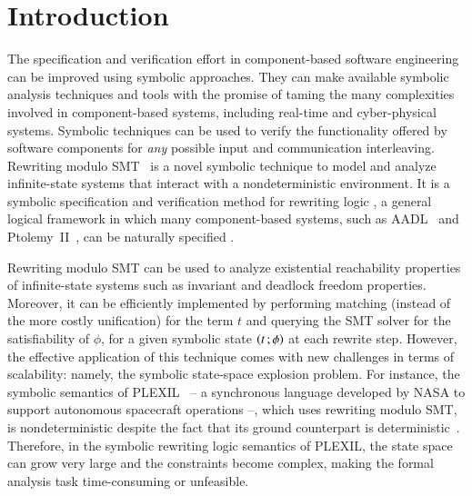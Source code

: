 
\section{Introduction}
\label{sec.intro}

The specification and verification effort in component-based software
engineering 
can be
improved using symbolic approaches.  They can make available symbolic analysis %
techniques and tools with the promise of taming the
many complexities involved in component-based systems, including real-time and cyber-physical
systems. %
Symbolic techniques can be used
to verify the functionality offered by software components for
\emph{any} possible input and communication interleaving. Rewriting
modulo SMT~\cite{rocha-rewsmtjlamp-2017} is a novel symbolic technique
to model and analyze %
infinite-state systems
that interact with a nondeterministic environment. 
It is a symbolic
specification and verification method for 
rewriting logic \cite{meseguer-rltcs-1992},
a general logical framework
in which many component-based systems,
such as AADL~\cite{mr-synch-aadl-fm14} and Ptolemy~II~\cite{ptolemy-journal}, %
can be naturally specified \cite{meseguer2012twenty}.


Rewriting modulo SMT can be used to analyze existential reachability
properties of infinite-state systems such as invariant and deadlock freedom
properties.  Moreover, it can be efficiently implemented by performing
matching (instead of the more costly unification) for the term $t$ and
querying the SMT solver for the satisfiability of $\phi$, for a given
symbolic state $\left( t \,; \phi \right)$ at each rewrite step. 
%
However, the
effective application of this technique comes with new challenges in
terms of scalability: namely, the symbolic state-space explosion
problem. %
For instance, the
symbolic semantics of
PLEXIL~\cite{rocha-thesis-2012,rocha-rewsmtjlamp-2017} -- a
synchronous language developed by NASA to support autonomous
spacecraft operations %
--, which uses rewriting modulo SMT, is nondeterministic despite the fact that its ground
counterpart is deterministic~\cite{dowek-plexilsos-2010}. 
Therefore,
in the symbolic rewriting logic semantics of
PLEXIL, the state space can grow very large and the constraints become
complex, making the formal analysis task time-consuming or unfeasible.

